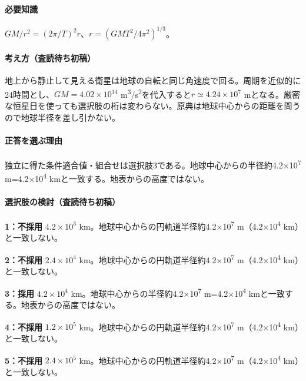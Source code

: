 \paragraph{必要知識} \(GM/r^2=(2\pi/T)^2r\)、\(r=(GMT^2/4\pi^2)^{1/3}\)。

\paragraph{考え方（査読待ち初稿）} 地上から静止して見える衛星は地球の自転と同じ角速度で回る。周期を近似的に24時間とし、\(GM=4.02\times10^{14}\) m\textsuperscript{3}/s\textsuperscript{2}を代入すると\(r\simeq4.24\times10^7\) mとなる。厳密な恒星日を使っても選択肢の桁は変わらない。原典は地球中心からの距離を問うので地球半径を差し引かない。

\paragraph{正答を選ぶ理由} 独立に得た条件適合値・組合せは選択肢3である。地球中心からの半径約4.2×10\textsuperscript{7} m=\allowbreak{}4.2×10\textsuperscript{4} kmと一致する。地表からの高度ではない。

\paragraph{選択肢の検討（査読待ち初稿）}\mbox{}\par

\noindent\textbf{1：不採用} \(4.2\times10^3\) km。地球中心からの円軌道半径約4.2×10\textsuperscript{7} m（4.2×10\textsuperscript{4} km）と一致しない。\par

\noindent\textbf{2：不採用} \(2.4\times10^4\) km。地球中心からの円軌道半径約4.2×10\textsuperscript{7} m（4.2×10\textsuperscript{4} km）と一致しない。\par

\noindent\textbf{3：採用} \(4.2\times10^4\) km。地球中心からの半径約4.2×10\textsuperscript{7} m=\allowbreak{}4.2×10\textsuperscript{4} kmと一致する。地表からの高度ではない。\par

\noindent\textbf{4：不採用} \(1.2\times10^5\) km。地球中心からの円軌道半径約4.2×10\textsuperscript{7} m（4.2×10\textsuperscript{4} km）と一致しない。\par

\noindent\textbf{5：不採用} \(2.4\times10^5\) km。地球中心からの円軌道半径約4.2×10\textsuperscript{7} m（4.2×10\textsuperscript{4} km）と一致しない。\par

